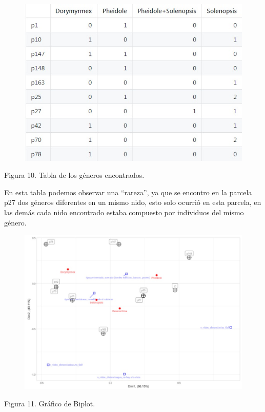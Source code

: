\documentclass[11pt,]{article}
\begin{document}
\begin{figure}
\centering
\includegraphics{similtud.jpg}
\caption{}
\end{figure}

Figura 10. Tabla de los géneros encontrados.

En esta tabla podemos observar una ``rareza'', ya que se encontro en la
parcela p27 dos géneros diferentes en un mismo nido, esto solo ocurrió
en esta parcela, en las demás cada nido encontrado estaba compuesto por
individuos del mismo género.

\begin{figure}
\centering
\includegraphics{biplot.jpg}
\caption{}
\end{figure}

Figura 11. Gráfico de Biplot.
\end{document}
